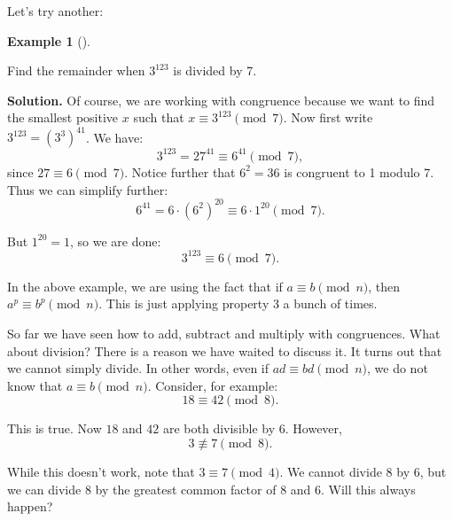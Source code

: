 \documentclass[10pt,]{book}
\theoremstyle{plain}
\theoremstyle{definition}
\newtheorem{example}[theorem]{Example}
\theoremstyle{definition}
\theoremstyle{definition}
\numberwithin{equation}{chapter}
\begin{document}
Let's try another:
%
\begin{example}[]\label{example-118}

Find the remainder when \(3^{123}\) is divided by 7.
%
\par\medskip\noindent%
\textbf{Solution.}\quad
Of course, we are working with congruence because we want to find the smallest positive \(x\) such that \(x \equiv 3^{123} \pmod 7\). Now first write \(3^{123} = (3^3)^{41}\). We have:
\begin{equation*}
  3^{123} = 27^{41} \equiv 6^{41} \pmod 7,
\end{equation*}
since \(27 \equiv 6 \pmod 7\). Notice further that \(6^2 = 36\) is congruent to 1 modulo 7. Thus we can simplify further:
\begin{equation*}
  6^{41} = 6\cdot (6^2)^{20} \equiv 6 \cdot 1^{20} \pmod 7.
\end{equation*}
%
\par

But \(1^{20} = 1\), so we are done:
\begin{equation*}
  3^{123} \equiv 6 \pmod 7.
\end{equation*}
%
\end{example}
\par

In the above example, we are using the fact that if \(a \equiv b \pmod n\), then \(a^p \equiv b^p \pmod n\). This is just applying property 3 a bunch of times.
%
\par

So far we have seen how to add, subtract and multiply with congruences. What about division? There is a reason we have waited to discuss it. It turns out that we cannot simply divide. In other words, even if \(ad \equiv bd \pmod n\), we do not know that \(a \equiv b \pmod n\). Consider, for example:
\begin{equation*}
  18 \equiv 42 \pmod 8.
\end{equation*}
%
\par

This is true. Now \(18\) and \(42\) are both divisible by 6. However,
\begin{equation*}
  3 \not\equiv 7 \pmod 8.
\end{equation*}
%
\par

While this doesn't work, note that \(3 \equiv 7 \pmod 4\). We cannot divide \(8\) by 6, but we can divide 8 by the greatest common factor of \(8\) and \(6\). Will this always happen?
%
\par
\end{document}

